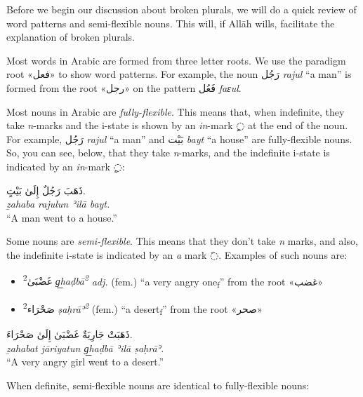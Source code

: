 \documentclass[
  10pt,
]{book}
\providecommand{\tightlist}{%
  \setlength{\itemsep}{0pt}\setlength{\parskip}{0pt}}
\begin{document}
Before we begin our discussion about broken plurals, we will do a quick review of word patterns and semi-flexible nouns. This will, if Allāh wills, facilitate the explanation of broken plurals.

Most words in Arabic are formed from three letter roots. We use the paradigm root \foreignlanguage{arabic}{«فعل»} to show word patterns. For example, the noun \foreignlanguage{arabic}{رَجُل} \emph{rajul} \enquote{a man} is formed from the root \foreignlanguage{arabic}{«رجل»} on the pattern \foreignlanguage{arabic}{فَعُل} \emph{faɛul}.

Most nouns in Arabic are \emph{fully-flexible}. This means that, when indefinite, they take \emph{n}-marks and the i-state is shown by an \emph{in}-mark \foreignlanguage{arabic}{◌ٍ} at the end of the noun. For example, \foreignlanguage{arabic}{رَجُل} \emph{rajul} \enquote{a man} and \foreignlanguage{arabic}{بَيْت} \emph{bayt} \enquote{a house} are fully-flexible nouns. So, you can see, below, that they take \emph{n}-marks, and the indefinite i-state is indicated by an \emph{in}-mark \foreignlanguage{arabic}{◌ٍ}:

\foreignlanguage{arabic}{ذَهَبَ رَجُلٌ إِلَىٰ بَيْتٍ.}\\
\emph{ẕahaba rajulun ʾilā bayt.}\\
\enquote{A man went to a house.}

Some nouns are \emph{semi-flexible}. This means that they don't take \emph{n} marks, and also, the indefinite i-state is indicated by an \emph{a} mark \foreignlanguage{arabic}{◌َ}. Examples of such nouns are:

\begin{itemize}
\tightlist
\item
  \foreignlanguage{arabic}{غَضْبَىٰ\textsuperscript{2}} \emph{g͟haḍbā\textsuperscript{2}} \emph{adj.} (fem.) \enquote{a very angry one\textsubscript{f}} from the root \foreignlanguage{arabic}{«غضب»}
\item
  \foreignlanguage{arabic}{صَحْرَاء\textsuperscript{2}} \emph{ṣaḥrāʾ\textsuperscript{2}} (fem.) \enquote{a desert\textsubscript{f}} from the root \foreignlanguage{arabic}{«صحر»}
\end{itemize}

\foreignlanguage{arabic}{ذَهَبَتْ جَارِيَةٌ غَضْبَىٰ إِلَىٰ صَحْرَاءَ.}\\
\emph{ẕahabat jāriyatun g͟haḍbā ʾilā ṣaḥrāʾ.}\\
\enquote{A very angry girl went to a desert.}

When definite, semi-flexible nouns are identical to fully-flexible nouns:
\end{document}
